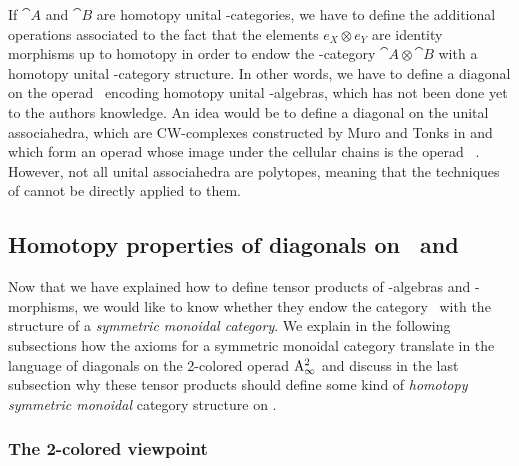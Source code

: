 \documentclass[twoside, 11pt]{amsart}
\theoremstyle{remark}
\begin{document}
If $\cat{A}$ and $\cat{B}$ are homotopy unital \Ainf -categories, we have to define the additional operations associated to the fact that the elements $e_X \otimes e_Y$ are identity morphisms up to homotopy in order to endow the \Ainf -category $\cat{A} \otimes \cat{B}$ with a homotopy unital \Ainf -category structure. In other words, we have to define a diagonal on the operad \uAinf\ encoding homotopy unital \Ainf -algebras, which has not been done yet to the authors knowledge. An idea would be to define a diagonal on the unital associahedra, which are CW-complexes constructed by Muro and Tonks in \cite{MuroTonks} and which form an operad whose image under the cellular chains is the operad \uAinf\ . However, not all unital associahedra are polytopes, meaning that the techniques of \cite{MTTV19} cannot be directly applied to them. 

\subsection{Homotopy properties of diagonals on \Ainf\ and \Minf}


Now that we have explained how to define tensor products of \Ainf -algebras and \Ainf -morphisms, we would like to know whether they endow the category \Aalg\ with the structure of a \textit{symmetric monoidal category}. We explain in the following subsections how the axioms for a symmetric monoidal category translate in the language of diagonals on the 2-colored operad $\mathrm{A}_\infty^2$ and discuss in the last subsection why these tensor products should define some kind of \textit{homotopy symmetric monoidal} category structure on \Aalg .

\subsubsection{The 2-colored viewpoint}
\end{document}
